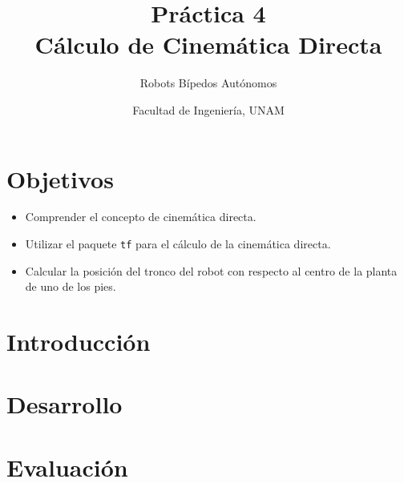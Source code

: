 \documentclass[letterpaper,12pt]{article}
\title{Práctica 4 \\ Cálculo de Cinemática Directa}
\author{Robots Bípedos Autónomos}
\date{Facultad de Ingeniería, UNAM}
\begin{document}
\renewcommand{\tablename}{Tabla}
\maketitle
\section*{Objetivos}
\begin{itemize}
\item Comprender el concepto de cinemática directa.
\item Utilizar el paquete \texttt{tf} para el cálculo de la cinemática directa.
\item Calcular la posición del tronco del robot con respecto al centro de la planta de uno de los pies.
\end{itemize}

\section{Introducción}

\section{Desarrollo}

\section{Evaluación}
\end{document}
